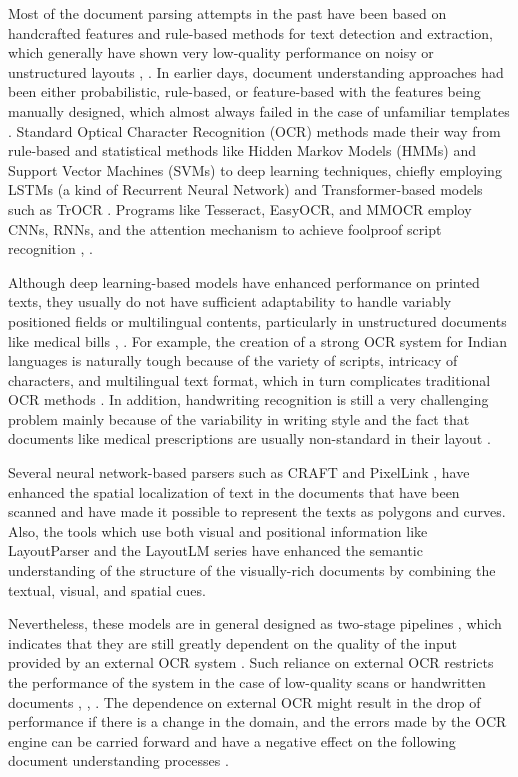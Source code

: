 \documentclass[conference,twocolumn]{IEEEtran}
\begin{document}
Most of the document parsing attempts in the past have been based on
handcrafted features and rule-based methods for text detection and
extraction, which generally have shown very low-quality performance on
noisy or unstructured layouts \cite{ref3}, \cite{ref5}. In earlier days,
document understanding approaches had been either probabilistic,
rule-based, or feature-based with the features being manually designed,
which almost always failed in the case of unfamiliar templates \cite{ref5}.
Standard Optical Character Recognition (OCR) methods made their way from
rule-based and statistical methods like Hidden Markov Models (HMMs) and
Support Vector Machines (SVMs) to deep learning techniques, chiefly
employing LSTMs (a kind of Recurrent Neural Network) and
Transformer-based models such as TrOCR \cite{ref5}. Programs like Tesseract,
EasyOCR, and MMOCR employ CNNs, RNNs, and the attention mechanism to
achieve foolproof script recognition \cite{ref2}, \cite{ref5}.

Although deep learning-based models have enhanced performance on printed
texts, they usually do not have sufficient adaptability to handle
variably positioned fields or multilingual contents, particularly in
unstructured documents like medical bills \cite{ref4}, \cite{ref5}. For example,
the creation of a strong OCR system for Indian languages is naturally
tough because of the variety of scripts, intricacy of characters, and
multilingual text format, which in turn complicates traditional OCR
methods \cite{ref5}. In addition, handwriting recognition is still a very
challenging problem mainly because of the variability in writing style
and the fact that documents like medical prescriptions are usually
non-standard in their layout \cite{ref6}.

Several neural network-based parsers such as CRAFT \cite{ref7} and PixelLink
\cite{ref8}, have enhanced the spatial localization of text in the documents
that have been scanned and have made it possible to represent the texts
as polygons and curves. Also, the tools which use both visual and
positional information like LayoutParser \cite{ref9} and the LayoutLM series
\cite{ref10} have enhanced the semantic understanding of the structure of
the visually-rich documents by combining the textual, visual, and
spatial cues.

Nevertheless, these models are in general designed as two-stage
pipelines \cite{ref3}, \cite{ref11} which indicates that they are still greatly
dependent on the quality of the input provided by an external OCR system
\cite{ref4}. Such reliance on external OCR restricts the performance of the
system in the case of low-quality scans or handwritten documents
\cite{ref3}, \cite{ref4}, \cite{ref11}. The dependence on external OCR might result
in the drop of performance if there is a change in the domain, and the
errors made by the OCR engine can be carried forward and have a negative
effect on the following document understanding processes \cite{ref4}.
\end{document}
